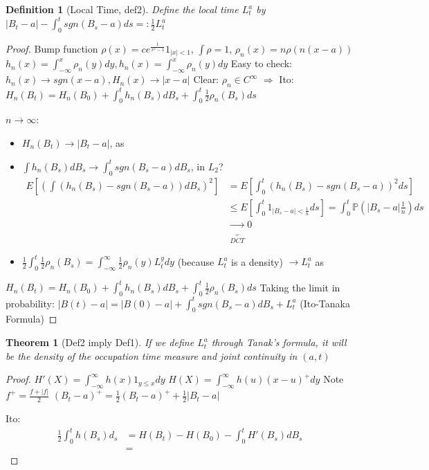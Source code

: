 \documentclass{article}
\newtheorem{theorem}{Theorem}
\newtheorem{definition}{Definition}
\begin{document}
\begin{definition}[Local Time, def2]
  Define the local time $L_t^a$ by $|B_t-a| - \int_0^t sgn(B_s-a)ds =: \frac12 L_t^a$
\end{definition}
\begin{proof}
  Bump function $\rho(x) = c e^{\frac1{x^2-1}}1_{|x| < 1}$,
  $\int \rho = 1$, $\rho_n(x) = n\rho(n(x-a))$
  $h_n(x) = \int_{-\infty}^x \rho_n(y)dy, h_n(x) = \int_{-\infty}^x
  \rho_n(y)dy$ Easy to check:
  $h_n(x) \rightarrow sgn(x-a), H_n(x) \rightarrow |x - a|$ Clear:
  $\rho_n \in C^{\infty}$ $\Rightarrow$ Ito:
  $H_n(B_t) = H_n(B_0) + \int_0^t h_n(B_s)dB_s + \int_0^t \frac12
  \rho_n(B_s)ds$

  $n \rightarrow \infty$:
  \begin{itemize}
  \item $H_n(B_t) \rightarrow |B_t - a|$, as
  \item $\int h_n(B_s)dB_s \rightarrow \int_0^t sgn(B_s - a)dB_s$, in
    $L_2$?
    \begin{align*}
      E[\left(\int (h_n(B_s) - sgn(B_s - a))dB_s\right)^2]
      &= E[ \int_0^t (h_n(B_s) - sgn(B_s-a))^2 ds ]
      \\&\le E[ \int_0^t 1_{|B_s-a| < \frac1n}  ds ] = \int_0^t \mathbb P(|B_s - a| \frac 1n) ds
      \\ &\underbrace{\rightarrow}_{DCT} 0
    \end{align*}
  \item
    $\frac12 \int_0^t \frac12 \rho_n(B_s) = \int_{-\infty}^{\infty}
    \frac12 \rho_n(y)L_t^ydy$ (because $L_t^a$ is a density)
    $\rightarrow L_t^a$ as
  
  \end{itemize}

  $H_n(B_t) = H_n(B_0) + \int_0^t h_n(B_s)dB_s + \int_0^t \frac12
  \rho_n(B_s)ds$ Taking the limit in probability:
  $|B(t)-a| = |B(0) - a| + \int_0^t sgn(B_s-a)dB_s + L_t^a$ (Ito-Tanaka Formula)
\end{proof}
\begin{theorem}[Def2 imply Def1]
  If we define $L_t^a$ through Tanak's formula, it will be the density of the occupation time measure and joint continuity in $(a, t)$
\end{theorem}
\begin{proof}
  $H'(X) = \int_{-\infty}^{\infty}h(x) 1_{y \le x}dy$
  $H(X) = \int_{-\infty}^{\infty}h(u)(x-u)^+ dy$
  Note $f^+ = \frac{f+ |f|}2$
  $(B_t - a)^+ = \frac12 (B_t - a)^+ + \frac12 |B_t - a|$

  Ito:
  \begin{align*}
    \frac12 \int_0^t h(B_s)d_s &= H(B_t) - H(B_0) - \int_0^t H'(B_s)dB_s
    \\&= 
  \end{align*}
\end{proof}
\end{document}
